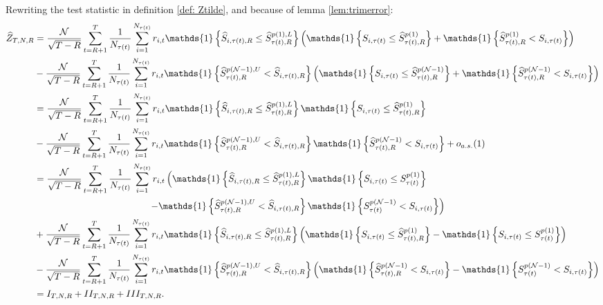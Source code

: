 Rewriting the test statistic in definition \ref{def: Ztilde}, and because of lemma \ref{lem:trimerror}:
\begin{align*}
    \widehat{Z}_{T,N,R} &=\frac{\mathcal{N}}{\sqrt{T-R}}\sum_{t=R+1}^{T}\frac{1}{N_{\tau(t)}}\sum_{i=1}^{N_{\tau(t)}} r_{i,t} \mathds{1} \left\{ \widehat{S}_{i,\tau(t),R}\leq \widehat{S}_{\tau(t),R}^{p(1),L} \right\} \left( \mathds{1} \left\{ S_{i,\tau(t)} \leq \widehat{S}_{\tau(t),R}^{p(1)} \right\} + \mathds{1} \left\{ \widehat{S}_{\tau(t),R}^{p(1)} < S_{i,\tau(t)} \right\} \right) \\
    &- \frac{\mathcal{N}}{\sqrt{T-R}}\sum_{t=R+1}^{T}\frac{1}{N_{\tau(t)}}\sum_{i=1}^{N_{\tau(t)}} r_{i,t} \mathds{1}\left\{  \widehat{S}_{\tau(t),R}^{p(\mathcal{N}-1),U} < \widehat{S}_{i,\tau(t),R}\right\} \left( \mathds{1} \left\{ S_{i,\tau(t)} \leq  \widehat{S}_{\tau(t),R}^{p(\mathcal{N}-1)} \right\} + \mathds{1} \left\{ \widehat{S}_{\tau(t),R}^{p(\mathcal{N}-1)} < S_{i,\tau(t)} \right\} \right) \\
    &=\frac{\mathcal{N}}{\sqrt{T-R}}\sum_{t=R+1}^{T}\frac{1}{N_{\tau(t)}}\sum_{i=1}^{N_{\tau(t)}} r_{i,t} \mathds{1} \left\{ \widehat{S}_{i,\tau(t),R}\leq \widehat{S}_{\tau(t),R}^{p(1),L} \right\} \mathds{1} \left\{ S_{i,\tau(t)} \leq \widehat{S}_{\tau(t),R}^{p(1)} \right\} \\
    &- \frac{\mathcal{N}}{\sqrt{T-R}}\sum_{t=R+1}^{T}\frac{1}{N_{\tau(t)}}\sum_{i=1}^{N_{\tau(t)}} r_{i,t} \mathds{1}\left\{ \widehat{S}_{\tau(t),R}^{p(\mathcal{N}-1),U} < \widehat{S}_{i,\tau(t),R}\right\} \mathds{1} \left\{ \widehat{S}_{\tau(t),R}^{p(\mathcal{N}-1)} < S_{i,\tau(t)} \right\} + o_{a.s.}(1) \\
    &=\frac{\mathcal{N}}{\sqrt{T-R}}\sum_{t=R+1}^{T}\frac{1}{N_{\tau(t)}}\sum_{i=1}^{N_{\tau(t)}}r_{i,t}\left( \mathds{1} \left\{ \widehat{S}_{i,\tau(t),R}\leq \widehat{S}_{\tau(t),R}^{p(1),L}\right\} \mathds{1} \left\{ S_{i,\tau(t)}\leq S_{\tau(t)}^{p(1)}\right\} \right. \\
    & \hspace{4.3cm} \left. -\mathds{1} \left\{ \widehat{S}_{\tau(t),R}^{p(\mathcal{N}-1),U} < \widehat{S}_{i,\tau(t),R}\right\} \mathds{1} \left\{ S_{\tau(t)}^{p(\mathcal{N}-1)} < S_{i,\tau(t)}\right\} \right) \\
    &+\frac{\mathcal{N}}{\sqrt{T-R}}\sum_{t=R+1}^{T}\frac{1}{N_{\tau(t)}}\sum_{i=1}^{N_{\tau(t)}}r_{i,t} \mathds{1} \left\{ \widehat{S}_{i,\tau(t),R}\leq \widehat{S}_{\tau(t),R}^{p(1),L}\right\} \left( \mathds{1} \left\{ S_{i,\tau(t)}\leq \widehat{S}_{\tau(t),R}^{p(1)}\right\} -\mathds{1} \left\{ S_{i,\tau(t)}\leq S_{\tau(t)}^{p(1)}\right\} \right) \\
    &-\frac{\mathcal{N}}{\sqrt{T-R}}\sum_{t=R+1}^{T}\frac{1}{N_{\tau(t)}}\sum_{i=1}^{N_{\tau(t)}}r_{i,t} \mathds{1} \left\{\widehat{S}_{\tau(t),R}^{p(\mathcal{N}-1),U} < \widehat{S}_{i,\tau(t),R}\right\} \left( \mathds{1} \left\{ \widehat{S}_{\tau(t),R}^{p(\mathcal{N}-1)} < S_{i,\tau(t)} \right\} -\mathds{1} \left\{ S_{\tau(t)}^{p(\mathcal{N}-1)} < S_{i,\tau(t)}\right\} \right) \\
    &=I_{T,N,R}+II_{T,N,R}+III_{T,N,R}.
\end{align*}
